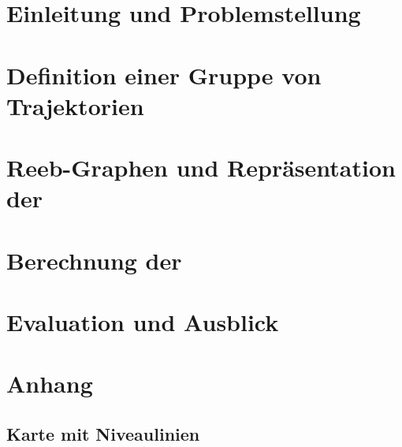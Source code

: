 




\tableofcontents

\cleardoubleoddemptypage%
\setcounter{page}{1}
\setcounter{footnote}{0}

\chapter{Einleitung und Problemstellung}%
\label{cha:einleitung}


\chapter{Definition einer Gruppe von Trajektorien}%
\label{cha:def_gruppe}


\chapter{Reeb-Graphen und Repräsentation der \GrpStruktur}%
\label{cha:reeb_graphen}


\chapter{Berechnung der \GrpStruktur}%
\label{cha:berechnung}


\chapter{Evaluation und Ausblick}%
\label{cha:eval}



\cleardoubleoddemptypage%
\setcounter{page}{1}
\appendix
\chapter{Anhang}%
\label{cha:anhang}
\section{Karte mit Niveaulinien}%
\label{sec:karte_niveau}

\printindex
\listoffigures
\printbibliography%

